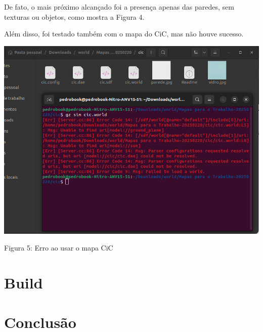 \documentclass[a4 paper]{article}
\begin{document}
De fato,  o mais próximo alcançado foi a presença apenas das paredes, sem texturas ou objetos, como mostra a Figura 4.


Além disso, foi testado também com o mapa do CiC, mas não houve sucesso.


\begin{table}[h]
\centering
\includegraphics[scale=0.4]{figuras/cicerror}
\end{table}
\begin{center}
Figura 5: Erro ao usar o mapa CiC
\end{center}

\section{Build}





\section{Conclusão}
\end{document}
